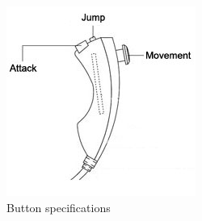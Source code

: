 \begin{figure}[h]
  \centering
  \includegraphics[scale=0.6]{Figures/nunchuk}
  \caption{Button specifications}
\label{fig:Nunchuk}
\end{figure}






